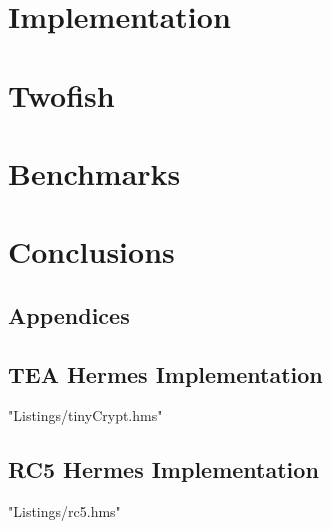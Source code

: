 \documentclass[a4paper,10pt,openright]{memoir}
\begin{document}
\chapter{Implementation}

%

%



\chapter{Twofish}
\label{chapt - Twofish}



\chapter{Benchmarks}
\label{chapt - Benchmarks}


\chapter{Conclusions}
\label{chapt - Conclusion}







\newpage

\renewcommand\bibname{References}




\clearpage
\newpage
\begin{appendices}
\renewcommand*{\lstlistingname}{Appendix}
\chapter{Appendices}
\section{TEA Hermes Implementation}
\label{code:TEA_Full_Imp}
 {"Listings/tinyCrypt.hms"}
\newpage
\section{RC5 Hermes Implementation}
\label{code:RC5_Full_Imp}
 {"Listings/rc5.hms"}

\end{appendices}
\end{document}
